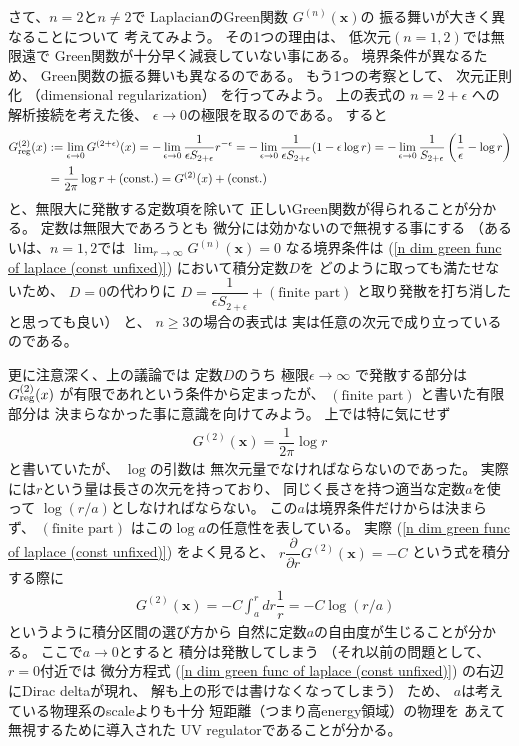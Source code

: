 さて、$n = 2$と$n \neq 2$で
LaplacianのGreen関数
$G^{(n)}(\bm{x})$の
振る舞いが大きく異なることについて
考えてみよう。
その1つの理由は、
低次元$(n = 1,2)$では無限遠で
Green関数が十分早く減衰していない事にある。
境界条件が異なるため、
Green関数の振る舞いも異なるのである。
もう1つの考察として、
次元正則化
（dimensional regularization）
を行ってみよう。
上の表式の
$n = 2 + \epsilon$
への解析接続を考えた後、
$\epsilon \to 0$の極限を取るのである。
すると
\begin{align}
    G^{(2)}_{\rm reg}(x)
&:=
    \lim_{\epsilon \to 0}
    G^{(2 + \epsilon)}(x)
=
    -
    \lim_{\epsilon \to 0}
    \dfrac{1}{
        \epsilon
        S_{2 + \epsilon}
    }
    r^{- \epsilon}
=
    -
    \lim_{\epsilon \to 0}
    \dfrac{1}{
        \epsilon
        S_{2 + \epsilon}
    }
    (1 - \epsilon \log r)
=
    -
    \lim_{\epsilon \to 0}
    \dfrac{1}{
        S_{2 + \epsilon}
    }
    \left(
        \dfrac{1}{\epsilon}
    -
        \log r
    \right)
\notag\\&=
    \dfrac{1}{
        2 \pi
    }
        \log r
    + (\text{const.})
=
    G^{(2)}(x)
    + (\text{const.})
\end{align}
と、無限大に発散する定数項を除いて
正しいGreen関数が得られることが分かる。
定数は無限大であろうとも
微分には効かないので無視する事にする
（あるいは、$n = 1, 2$では
$\lim_{r \to \infty}
    G^{(n)}(\bm{x}) = 0$
なる境界条件は
(\ref{n dim green func of laplace (const unfixed)})
において積分定数$D$を
どのように取っても満たせないため、
$D = 0$の代わりに
$D = \dfrac{1}
    {\epsilon S_{2 + \epsilon}}
    +
    (\text{finite part})$
と取り発散を打ち消したと思っても良い）
と、
$n \ge 3$の場合の表式は
実は任意の次元で成り立っているのである。

更に注意深く、上の議論では
定数$D$のうち
極限$\epsilon \to \infty$
で発散する部分は
$G^{(2)}_{\rm reg}(x)$
が有限であれという条件から定まったが、
$(\text{finite part})$
と書いた有限部分は
決まらなかった事に意識を向けてみよう。
上では特に気にせず
\begin{align}
    G^{(2)} (\bm{x})
    =
    \dfrac{1}{
        2 \pi
    }
        \log r
\end{align}
と書いていたが、
$\log$の引数は
無次元量でなければならないのであった。
実際には$r$という量は長さの次元を持っており、
同じく長さを持つ適当な定数$a$を使って
$\log (r/a)$としなければならない。
この$a$は境界条件だけからは決まらず、
$(\text{finite part})$
はこの$\log a$の任意性を表している。
実際
(\ref{n dim green func of laplace (const unfixed)})
をよく見ると、
$r
\dfrac{\partial}{\partial r}
G^{(2)}(\bm{x})
=
- C$
という式を積分する際に
\begin{align}
    &G^{(2)}(\bm{x})
    =
        - C
        \int_{a}^r dr
        \dfrac{1}{r}
    =
        - C
        \log (r/a)
\end{align}
というように積分区間の選び方から
自然に定数$a$の自由度が生じることが分かる。
ここで$a \to 0$とすると
積分は発散してしまう
（それ以前の問題として、
$r = 0$付近では
微分方程式
(\ref{n dim green func of laplace (const unfixed)})
の右辺にDirac deltaが現れ、
解も上の形では書けなくなってしまう）
ため、
$a$は考えている物理系のscaleよりも十分
短距離（つまり高energy領域）の物理を
あえて無視するために導入された
UV regulatorであることが分かる。

